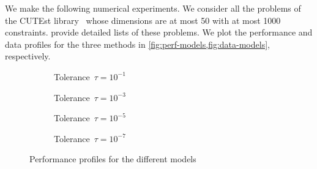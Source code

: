 We make the following numerical experiments.
We consider all the problems of the CUTEst library~\cite{Gould_Orban_Toint_2015} whose dimensions are at most \num{50} with at most \num[group-minimum-digits=4]{1000} constraints.
 provide detailed lists of these problems.
We plot the performance and data profiles for the three methods in \cref{fig:perf-models,fig:data-models}, respectively.

\begin{figure}[ht]
    \centering
    \begin{subfigure}[b]{0.49\textwidth}
        \centering
        \caption{Tolerance~$\tau = 10^{-1}$}
    \end{subfigure}
    \hfill
    \begin{subfigure}[b]{0.49\textwidth}
        \centering
        \caption{Tolerance~$\tau = 10^{-3}$}
    \end{subfigure}
    \begin{subfigure}[b]{0.49\textwidth}
        \centering
        \caption{Tolerance~$\tau = 10^{-5}$}
    \end{subfigure}
    \hfill
    \begin{subfigure}[b]{0.49\textwidth}
        \centering
        \caption{Tolerance~$\tau = 10^{-7}$}
    \end{subfigure}
    \caption{Performance profiles for the different models}
    \label{fig:perf-models}
\end{figure}


